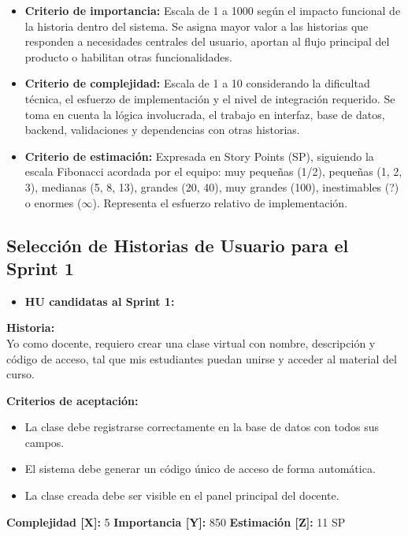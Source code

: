 \documentclass[12pt,a4paper]{article}
\begin{document}
\begin{itemize}
    \item \textbf{Criterio de importancia:} Escala de 1 a 1000 según el impacto funcional de la historia dentro del sistema. Se asigna mayor valor a las historias que responden a necesidades centrales del usuario, aportan al flujo principal del producto o habilitan otras funcionalidades.

    \item \textbf{Criterio de complejidad:} Escala de 1 a 10 considerando la dificultad técnica, el esfuerzo de implementación y el nivel de integración requerido. Se toma en cuenta la lógica involucrada, el trabajo en interfaz, base de datos, backend, validaciones y dependencias con otras historias.

    \item \textbf{Criterio de estimación:} Expresada en Story Points (SP), siguiendo la escala Fibonacci acordada por el equipo: muy pequeñas (1/2), pequeñas (1, 2, 3), medianas (5, 8, 13), grandes (20, 40), muy grandes (100), inestimables (?) o enormes ($\infty$). Representa el esfuerzo relativo de implementación.
\end{itemize}

\subsection{Selección de Historias de Usuario para el Sprint 1}

\begin{itemize}
    \item \textbf{HU candidatas al Sprint 1:}
\end{itemize}

\vspace{0.5em}

\begin{tcolorbox}[title=\textbf{HU-S1-01: Crear una clase virtual}]
\textbf{Historia:} \\
Yo como docente, requiero crear una clase virtual con nombre, descripción y código de acceso, tal que mis estudiantes puedan unirse y acceder al material del curso.

\vspace{0.5em}
\textbf{Criterios de aceptación:}
\begin{itemize}
    \item La clase debe registrarse correctamente en la base de datos con todos sus campos.
    \item El sistema debe generar un código único de acceso de forma automática.
    \item La clase creada debe ser visible en el panel principal del docente.
\end{itemize}
\textbf{Complejidad [X]:} 5 \hfill \textbf{Importancia [Y]:} 850 \hfill \textbf{Estimación [Z]:} 11 SP
\end{tcolorbox}
\end{document}

